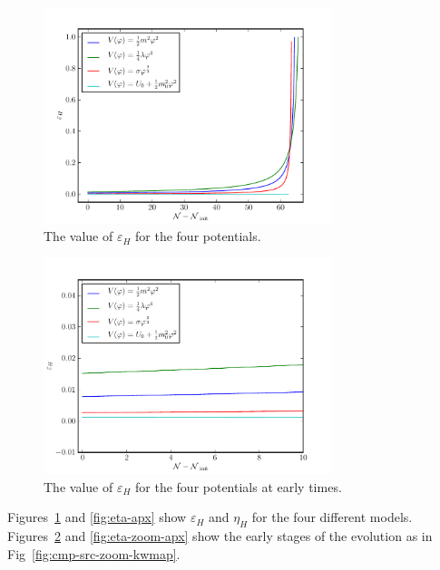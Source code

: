\begin{figure}
 \centering
 \includegraphics[width=0.75\textwidth]{numerical/graphs/epsilon_slowroll-large.pdf}
 \caption{The value of $\varepsilon_H$ for the four potentials.}
 \label{fig:eps-apx}
\end{figure}

\begin{figure}
 \centering
 \includegraphics[width=0.75\textwidth]{numerical/graphs/epsilon_slowroll_zoom-large.pdf}
 \caption{The value of $\varepsilon_H$ for the four potentials at early times.}
 \label{fig:eps-zoom-apx}
\end{figure}

Figures~\ref{fig:eps-apx} and \ref{fig:eta-apx} show $\varepsilon_H$ and $\eta_H$ for the
four different models. Figures~\ref{fig:eps-zoom-apx} and
\ref{fig:eta-zoom-apx} show the early stages of the evolution as in
Fig~\ref{fig:cmp-src-zoom-kwmap}.

